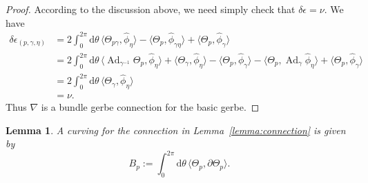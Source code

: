 \documentclass[12pt]{amsart}
\DeclareMathOperator{\Ad}{Ad}
\theoremstyle{plain}
\newtheorem{lemma}[theorem]{Lemma}
\theoremstyle{definition}
\theoremstyle{remark}
\numberwithin{equation}{section}
\renewcommand{\d}{\delta}
\newcommand{\<}{\langle}
\renewcommand{\>}{\rangle}
\newcommand{\intSone}{\int_{0}^{2\pi}\mathrm{d}\theta\,}
\newcommand{\phihat}{\widehat{\phi}}
\begin{document}
\begin{proof}
According to the discussion above, we need simply check that $\d \epsilon = \nu$. We have
\begin{align*}
\delta \epsilon_{(p,\gamma,\eta)} & = 2\intSone\langle
  \Theta_{p\gamma},\phihat_\eta\rangle 
  - \langle\Theta_p,\phihat_{\gamma\eta} \rangle
  + \langle\Theta_p,\phihat_\gamma
\rangle\\
&=2\intSone\langle 
  \Ad_{\gamma^{-1}}\Theta_p,\phihat_\eta \rangle
  + \langle \Theta_\gamma,\phihat_\eta \rangle
  - \langle \Theta_p,\phihat_\gamma  \rangle
  - \langle \Theta_p,\Ad_\gamma\phihat_\eta \rangle
  + \langle \Theta_p,\phihat_\gamma \rangle
\\
&=2\intSone\langle \Theta_\gamma,\phihat_\eta\rangle \\
& = \nu.
\end{align*}
Thus $\nabla$ is a bundle gerbe connection for the basic gerbe.
\end{proof}

\label{form: basic gerbe curving}
\begin{lemma}\label{lemma:curving}
A curving for the connection in Lemma~\ref{lemma:connection} is given by 
\[
  B_p := \intSone \langle \Theta_p, \partial \Theta_p \rangle .
\]
\end{lemma}
\end{document}
